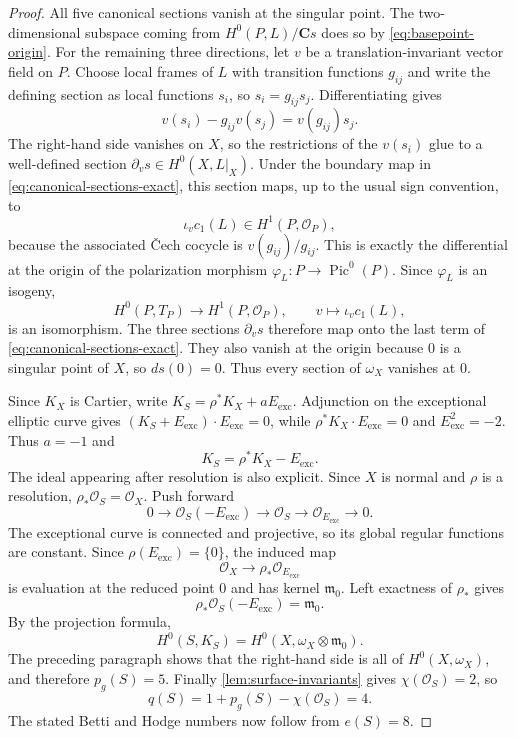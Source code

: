 \documentclass[10pt]{amsart}
\numberwithin{equation}{section}
\theoremstyle{definition}
\theoremstyle{remark}
\newcommand{\CC}{\mathbf C}
\newcommand{\exc}{\mathrm{exc}}
\begin{document}
\begin{proof}
All five canonical sections vanish at the singular point.
The two-dimensional subspace coming from $H^0(P,L)/\CC s$ does so by
\eqref{eq:basepoint-origin}.  For the remaining three directions, let $v$ be a translation-invariant
vector field on $P$.  Choose local frames of $L$ with transition functions
$g_{ij}$ and write the defining section as local functions $s_i$, so
$s_i=g_{ij}s_j$.  Differentiating gives
\[
 v(s_i)-g_{ij}v(s_j)=v(g_{ij})s_j.
\]
The right-hand side vanishes on $X$, so the restrictions of the $v(s_i)$
glue to a well-defined section
$\partial_v s\in H^0(X,L|_X)$.  Under the boundary map in
\eqref{eq:canonical-sections-exact}, this section maps, up to the usual sign
convention, to
\[
 \iota_v c_1(L)\in H^1(P,\mathcal O_P),
\]
because the associated \v{C}ech cocycle is $v(g_{ij})/g_{ij}$.  This is
exactly the differential at the origin of the polarization morphism
$\varphi_L:P\to\operatorname{Pic}^0(P)$.  Since $\varphi_L$ is an isogeny,
\[
 H^0(P,T_P)\longrightarrow H^1(P,\mathcal O_P),
 \qquad v\longmapsto\iota_vc_1(L),
\]
is an isomorphism.  The three sections $\partial_v s$ therefore map onto the
last term of \eqref{eq:canonical-sections-exact}.  They also vanish at the
origin because $0$ is a singular point of $X$, so $ds(0)=0$.  Thus every
section of $\omega_X$ vanishes at $0$.

Since $K_X$ is Cartier, write
$K_S=\rho^*K_X+aE_{\exc}$.  Adjunction on the exceptional elliptic curve gives
$(K_S+E_{\exc})\cdot E_{\exc}=0$, while
$\rho^*K_X\cdot E_{\exc}=0$ and $E_{\exc}^2=-2$.  Thus $a=-1$ and
\begin{equation}
 K_S=\rho^*K_X-E_{\exc}.
\label{eq:canonical-resolution}
\end{equation}
The ideal appearing after resolution is also explicit.  Since
$X$ is normal and $\rho$ is a resolution,
$\rho_*\mathcal O_S=\mathcal O_X$.  Push forward
\[
 0\longrightarrow\mathcal O_S(-E_{\exc})\longrightarrow\mathcal O_S
 \longrightarrow\mathcal O_{E_{\exc}}\longrightarrow0.
\]
The exceptional curve is connected and projective, so its global regular
functions are constant.  Since $\rho(E_{\exc})=\{0\}$, the induced map
\[
 \mathcal O_X\longrightarrow\rho_*\mathcal O_{E_{\exc}}
\]
is evaluation at the reduced point $0$ and has kernel $\mathfrak m_0$.
Left exactness of $\rho_*$ gives
\[
 \rho_*\mathcal O_S(-E_{\exc})=\mathfrak m_0.
\]
By the projection formula,
\[
 H^0(S,K_S)=H^0(X,\omega_X\otimes\mathfrak m_0).
\]
The preceding paragraph shows that the right-hand side is all of
$H^0(X,\omega_X)$, and therefore $p_g(S)=5$.  Finally
\cref{lem:surface-invariants} gives $\chi(\mathcal O_S)=2$, so
\[
 q(S)=1+p_g(S)-\chi(\mathcal O_S)=4.
\]
The stated Betti and Hodge numbers now follow from $e(S)=8$.
\end{proof}
\end{document}
